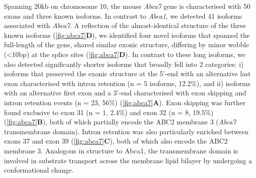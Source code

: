 Spanning 20kb on chromosome 10, the mouse \textit{Abca7} gene is characterised with 50 exons and three known isoforms. In contrast to \textit{Abca1}, we detected 41 isoforms associated with \textit{Abca7}. A reflection of the almost-identical structure of the three known isoforms (\cref{fig:abca7}\textbf{D}), we identified four novel isoforms that spanned the full-length of the gene, shared similar exonic structure, differing by minor wobble (<10bp) at the splice sites (\cref{fig:abca7}\textbf{D}). In contrast to these long isoforms, we also detected significantly shorter isoforms that broadly fell into 2 categories: i) isoforms that preserved the exonic structure at the 5'-end with an alternative last exon characterised with intron retention (n = 5 isoforms, 12.2\%), and ii) isoforms with an alternative first exon and a 3'-end characterised with exon skipping and intron retention events (n = 23, 56\%) (\cref{fig:abca7}\textbf{A}). Exon skipping was further found exclusive to exon 31 (n = 1, 2.4\%) and exon 32 (n = 8, 19.5\%) (\cref{fig:abca7}\textbf{B}), both of which partially encode the ABC2 membrane 3 (\textit{Abca7} transmembrane domain)\cite{DeRoeck2019a}. Intron retention was also particularly enriched between exons 37 and exon 39 (\cref{fig:abca7}\textbf{C}), both of which also encode the ABC2 membrane 3. Analogous in structure to Abca1, the transmembrane domain is involved in substrate transport across the membrane lipid bilayer by undergoing a conformational change. 

